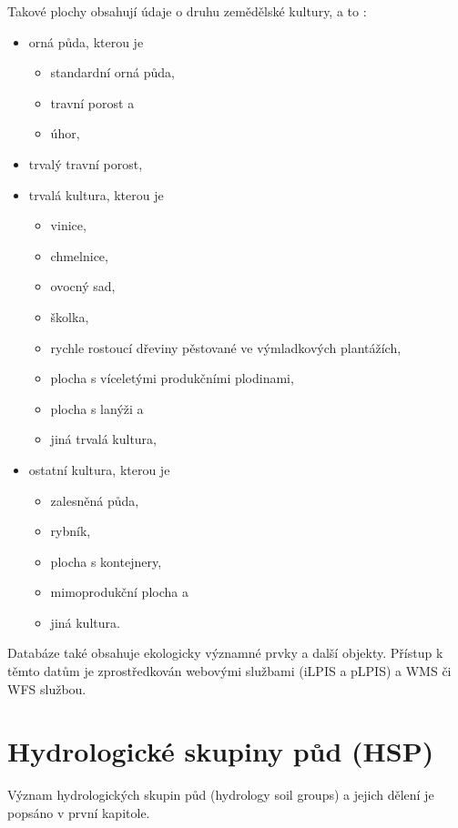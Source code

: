 \documentclass[a4paper,oneside,12pt]{book}
\begin{document}
Takové plochy obsahují údaje o druhu zemědělské kultury, a to \cite{sSYEwLE0rNKoWGYk}:
\begin{itemize}
    \item orná půda, kterou je
    \begin{itemize}
        \item standardní orná půda,
        \item travní porost a
        \item úhor,
    \end{itemize}
    \item trvalý travní porost,
    \item trvalá kultura, kterou je
    \begin{itemize}
        \item vinice,
        \item chmelnice,
        \item ovocný sad,
        \item školka,
        \item rychle rostoucí dřeviny pěstované ve výmladkových plantážích,
        \item plocha s víceletými produkčními plodinami,
        \item plocha s lanýži a
        \item jiná trvalá kultura, 
    \end{itemize}
    \item ostatní kultura, kterou je
    \begin{itemize}
        \item zalesněná půda,
        \item rybník,
        \item plocha s kontejnery,
        \item mimoprodukční plocha a
        \item jiná kultura.
    \end{itemize}
\end{itemize}

\hspace{10mm} Databáze také obsahuje ekologicky významné prvky a další objekty. \cite{sSYEwLE0rNKoWGYk}
Přístup k těmto datům je zprostředkován webovými službami (iLPIS a pLPIS)  a WMS či WFS službou. \cite{Devaty2018}

\section{Hydrologické skupiny půd (HSP)} \label{hsp}
\hspace{10mm}Význam hydrologických skupin půd (hydrology soil groups) a jejich dělení je popsáno v první kapitole. 
\end{document}
